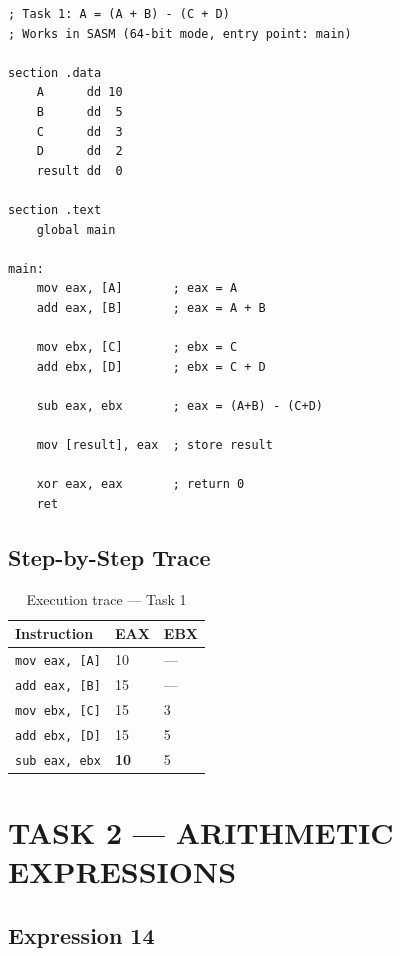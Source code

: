 \documentclass[12pt,a4paper]{article}
\begin{document}
\begin{lstlisting}[caption={task1\_expression.asm --- A = (A+B) - (C+D)}]
; Task 1: A = (A + B) - (C + D)
; Works in SASM (64-bit mode, entry point: main)

section .data
    A      dd 10
    B      dd  5
    C      dd  3
    D      dd  2
    result dd  0

section .text
    global main

main:
    mov eax, [A]       ; eax = A
    add eax, [B]       ; eax = A + B

    mov ebx, [C]       ; ebx = C
    add ebx, [D]       ; ebx = C + D

    sub eax, ebx       ; eax = (A+B) - (C+D)

    mov [result], eax  ; store result

    xor eax, eax       ; return 0
    ret
\end{lstlisting}

\subsection{Step-by-Step Trace}

\begin{table}[H]
\centering
\caption{Execution trace --- Task 1}
\small
\begin{tabular}{|l|l|l|}
\hline
\textbf{Instruction} & \textbf{EAX} & \textbf{EBX} \\
\hline
\texttt{mov eax, [A]}  & 10 & --- \\
\hline
\texttt{add eax, [B]}  & 15 & --- \\
\hline
\texttt{mov ebx, [C]}  & 15 & 3 \\
\hline
\texttt{add ebx, [D]}  & 15 & 5 \\
\hline
\texttt{sub eax, ebx}  & \textbf{10} & 5 \\
\hline
\end{tabular}
\end{table}

\newpage
\section{TASK 2 --- ARITHMETIC EXPRESSIONS}

\subsection{Expression 14}
\end{document}
